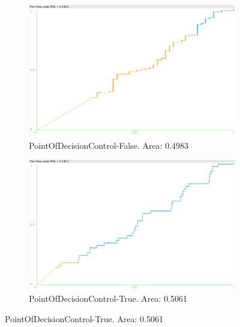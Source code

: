 \documentclass[11pt, notitlepage,abstracton,oneside]{article}   	%
\begin{document}
\begin{figure}[H]
    \begin{subfigure}[b]{0.45\textwidth}
        \centering
        \includegraphics[width=\textwidth]{figures/approach2/PointOfDecisionControl-False(0)}
        \caption{PointOfDecisionControl-False. Area: 0.4983}
        \label{fig:PointOfDecisionControl-False(0)}
    \end{subfigure}
    \hfill
    \begin{subfigure}[b]{0.45\textwidth}
        \centering
        \includegraphics[width=\textwidth]{figures/approach2/PointOfDecisionControl-True(1)}
        \caption{PointOfDecisionControl-True. Area: 0.5061}
        \label{fig:PointOfDecisionControl-True(1)}
    \end{subfigure}
    \hfill


\end{figure}
\end{document}
